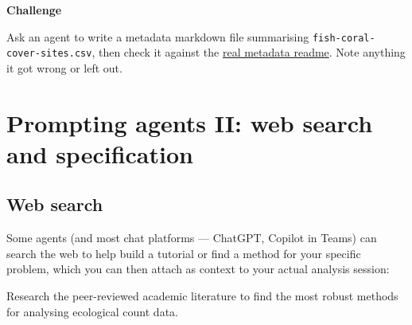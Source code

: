 \documentclass[
  letterpaper,
  DIV=11,
  numbers=noendperiod]{scrreprt}
\begin{document}
\begin{tcolorbox}[enhanced jigsaw, toprule=.15mm, rightrule=.15mm, left=2mm, leftrule=.75mm, breakable, opacityback=0, arc=.35mm, colframe=quarto-callout-important-color-frame, bottomrule=.15mm, colback=white]
\begin{minipage}[t]{5.5mm}
\textcolor{quarto-callout-important-color}{\faExclamation}
\end{minipage}%
\begin{minipage}[t]{\textwidth - 5.5mm}

\vspace{-3mm}\textbf{Challenge}\vspace{3mm}

Ask an agent to write a metadata markdown file summarising
\texttt{fish-coral-cover-sites.csv}, then check it against the
\href{https://raw.githubusercontent.com/cbrown5/example-ecological-data/refs/heads/main/data/benthic-reefs-and-fish/readme.md}{real
metadata readme}. Note anything it got wrong or left out.

\end{minipage}%
\end{tcolorbox}

\chapter{Prompting agents II: web search and
specification}\label{prompting-agents-ii-web-search-and-specification}

\section{Web search}\label{web-search}

Some agents (and most chat platforms --- ChatGPT, Copilot in Teams) can
search the web to help build a tutorial or find a method for your
specific problem, which you can then attach as context to your actual
analysis session:

\begin{tcolorbox}[enhanced jigsaw, bottomtitle=1mm, leftrule=.75mm, breakable, colbacktitle=quarto-callout-note-color!10!white, colframe=quarto-callout-note-color-frame, coltitle=black, toprule=.15mm, rightrule=.15mm, left=2mm, bottomrule=.15mm, title=\textcolor{quarto-callout-note-color}{\faInfo}\hspace{0.5em}{Prompt}, opacityback=0, arc=.35mm, toptitle=1mm, titlerule=0mm, opacitybacktitle=0.6, colback=white]

Research the peer-reviewed academic literature to find the most robust
methods for analysing ecological count data.

\end{tcolorbox}
\end{document}
